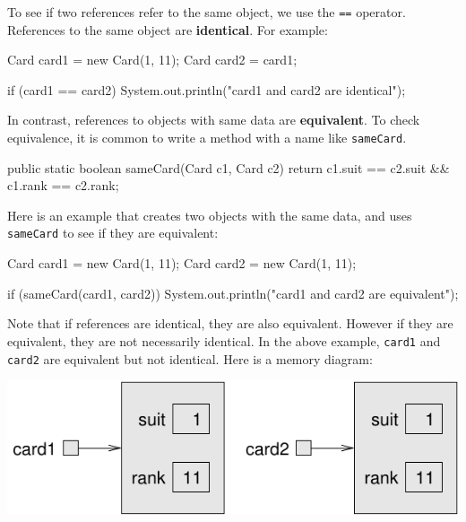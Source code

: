 \documentclass[12pt]{book}
\theoremstyle{exercise}
\newcommand{\java}[1]{\verb"#1"}
\newcommand{\java}[1]{\lstinline{#1}} %
\begin{document}

To see if two references refer to the same object, we use the \java{==} operator.
References to the same object are {\bf identical}.
For example:

\begin{code}
    Card card1 = new Card(1, 11);
    Card card2 = card1;

    if (card1 == card2) {
        System.out.println("card1 and card2 are identical");
    }
\end{code}


In contrast, references to objects with same data are {\bf equivalent}.
To check equivalence, it is common to write a method with a name like \java{sameCard}.

\begin{code}
    public static boolean sameCard(Card c1, Card c2) {
        return c1.suit == c2.suit && c1.rank == c2.rank;
    }
\end{code}

Here is an example that creates two objects with the same data, and uses \java{sameCard} to see if they are equivalent:

\begin{code}
    Card card1 = new Card(1, 11);
    Card card2 = new Card(1, 11);

    if (sameCard(card1, card2)) {
        System.out.println("card1 and card2 are equivalent");
    }
\end{code}

Note that if references are identical, they are also equivalent.
However if they are equivalent, they are not necessarily identical.
In the above example, \java{card1} and \java{card2} are equivalent but not identical.
Here is a memory diagram:

\begin{center}
\includegraphics{figs/card.pdf}
\end{center}

\end{document}
